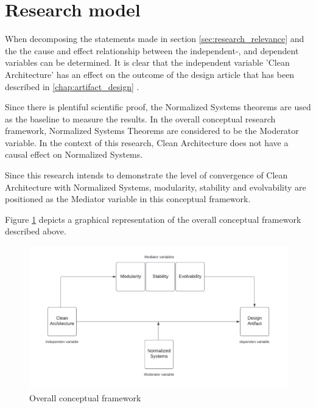 \section{Research model} \label{research_model}

When decomposing the statements made in section \ref{sec:research_relevance}
 and the  the cause and
effect relationship between the independent-, and dependent variables can be determined. It
is clear that the independent variable 'Clean Architecture' has an effect on the outcome
of the design article that has been described in \ref{chap:artifact_design}
. 

Since there is plentiful scientific proof, the Normalized Systems theorems are used as the
baseline to measure the results. In the overall conceptual research framework, Normalized
Systems Theorems are considered to be the Moderator variable. In the context of this
research, Clean Architecture does not have a causal effect on Normalized Systems.

Since this research intends to demonstrate the level of convergence of Clean Architecture
with Normalized Systems, modularity, stability and evolvability are positioned as the
Mediator variable in this conceptual framework.

Figure \ref{fig:conceptual_framework}  depicts a
graphical representation of the overall conceptual framework described above.

\begin{figure}[H]
    \centering
    \includegraphics[width=1\textwidth]{Figures/conceptual_framework}
    \caption[Overall conceptual framework]{Overall conceptual framework}
    \label{fig:conceptual_framework}
\end{figure}
